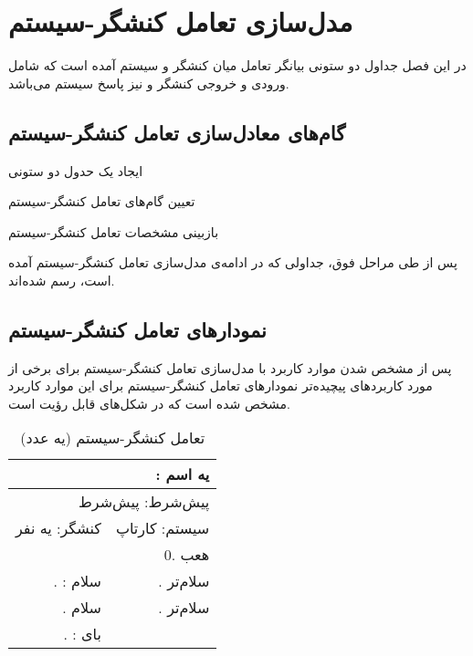 \documentclass[12pt,svgnames,oneside]{book}
\newcounter{itemadded}
\let\LaTeXStandardEnumerateBegin\enumerate
\let\LaTeXStandardEnumerateEnd\endenumerate
\renewenvironment{enumerate}{%
\LaTeXStandardEnumerateBegin%
\setcounter{itemadded}{0}
}{%
\LaTeXStandardEnumerateEnd%
}%
\newcommand{\uc}[1]{\lr{U{#1}}}
\newcommand{\tucbw}{\lr{TUCBW}}
\newcommand{\tucew}{\lr{TUCEW}}
\newcommand{\actorsystem}[1]{
کنشگر: {#1} &
سیستم: کارتاپ \\
}
\newcommand{\zerostep}[1]{
& 0. {#1} \\
}
\newcounter{UseCaseCounter}
\newcommand{\step}[1]{
\stepcounter{UseCaseCounter}\arabic{UseCaseCounter}. {#1}
}
\newcommand{\ucname}[2]{
\multicolumn{2}{|r|}{\uc{0{#1}}: {#2}} \\
}
\newcommand{\preif}[1]{
\multicolumn{2}{|r|}{پیش‌شرط:‌ {#1}} \\
}
\begin{document}
\chapter{مدل‌سازی تعامل کنشگر-سیستم}
در این فصل جداول دو‌ ستونی بیانگر تعامل میان کنشگر و سیستم آمده است که شامل ورودی و خروجی کنشگر و نیز پاسخ سیستم می‌باشد.


\section{گام‌های معادل‌سازی تعامل کنشگر-سیستم}
\begin{enumerate}
\item 
ایجاد یک حدول دو ستونی

\item 
تعیین گام‌های تعامل کنشگر-سیستم

\item 
بازبینی مشخصات تعامل کنشگر-سیستم
\end{enumerate}

پس از طی مراحل فوق، جداولی که در ادامه‌ی مدل‌سازی تعامل کنشگر-سیستم آمده‌ است، رسم شده‌اند.

\section{نمودار‌های تعامل کنشگر-سیستم}
پس از مشخص شدن موارد کاربرد با مدل‌سازی تعامل کنشگر-سیستم برای برخی از مورد‌ کاربرد‌های پیچیده‌تر نمودار‌های تعامل کنشگر-سیستم برای این موارد کاربرد مشخص شده است که در شکل‌های 
قابل رؤیت است.

\begin{table}[H]
\caption{تعامل کنشگر-سیستم (یه عدد)}
\begin{center}
\begin{tabular}{|r|r|}
\hline

\ucname{n}{یه اسم}
\hline

\preif{پیش‌شرط}
\hline

\actorsystem{یه نفر}
\hline

\zerostep{هعب}
\hline

\step{\tucbw: سلام} & 
\step{سلام‌تر} \\
\hline

\step{سلام} & 
\step{سلام‌تر} \\
\hline

\step{\tucew: بای} & 
\\
\hline

\end{tabular}
\end{center}
\end{table}


\end{document}
